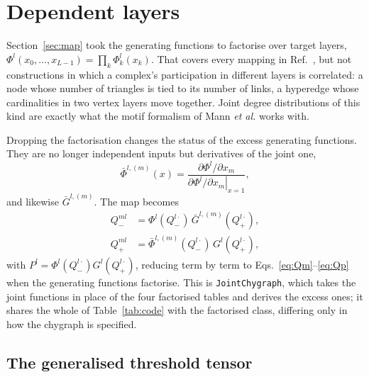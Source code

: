 \documentclass[aps,pre,twocolumn,superscriptaddress,floatfix,longbibliography]{revtex4-2}
\newcommand{\code}[1]{\texttt{#1}}
\begin{document}
\section{Dependent layers}\label{sec:joint}

Section~\ref{sec:map} took the generating functions to factorise over target layers,
$\Phi^l(x_0,\dots,x_{L-1})=\prod_k\Phi^l_k(x_k)$. That covers every mapping in
Ref.~\cite{vazquez2024comnet}, but not constructions in which a complex's
participation in different layers is correlated: a node whose number of
triangles is tied to its number of links, a hyperedge whose cardinalities in two
vertex layers move together. Joint degree distributions of this kind are exactly
what the motif formalism of Mann \textit{et al.} \cite{mann2021} works with.

Dropping the factorisation changes the status of the excess generating
functions. They are no longer independent inputs but derivatives of the joint
one,
\begin{equation}
  \bar\Phi^{l,(m)}(x)=\frac{\partial\Phi^l/\partial x_m}
                           {\left.\partial\Phi^l/\partial x_m\right|_{x=1}},
  \label{eq:excessderived}
\end{equation}
and likewise $\bar G^{l,(m)}$. The map becomes
\begin{align}
  Q^{ml}_- &= \Phi^l\!\left(Q^{l\cdot}_-\right)\,
              \bar G^{l,(m)}\!\left(Q^{l\cdot}_+\right),\nonumber\\
  Q^{ml}_+ &= \bar\Phi^{l,(m)}\!\left(Q^{l\cdot}_-\right)\,
              G^l\!\left(Q^{l\cdot}_+\right),
  \label{eq:jointmap}
\end{align}
with $P^l=\Phi^l(Q^{l\cdot}_-)G^l(Q^{l\cdot}_+)$, reducing term by term to
Eqs.~\eqref{eq:Qm}--\eqref{eq:Qp} when the generating functions factorise. This
is \code{JointChygraph}, which takes the joint functions in place of the four
factorised tables and derives the excess ones; it shares the whole of
Table~\ref{tab:code} with the factorised class, differing only in how the
chygraph is specified.

\subsection{The generalised threshold tensor}
\end{document}
